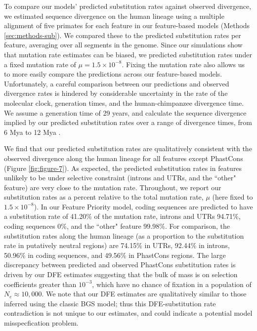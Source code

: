 \documentclass[11pt]{article}
\begin{document}
To compare our models' predicted substitution rates against observed
divergence, we estimated sequence divergence on the human lineage using a
multiple alignment of five primates for each feature in our feature-based
models (Methods \ref{sec:methods-sub}). We compared these to the predicted
substitution rates per feature, averaging over all segments in the genome.
Since our simulations show that mutation rate estimates can be biased, we
predicted substitution rates under a fixed mutation rate of $\mu = 1.5 \times
10^{-8}$. Fixing the mutation rate also allows us to more easily compare the
predictions across our feature-based models. Unfortunately, a careful
comparison between our predictions and observed divergence rates is hindered by
considerable uncertainty in the rate of the molecular clock, generation times,
and the human-chimpanzee divergence time. We assume a generation time of 29
years, and calculate the sequence divergence implied by our predicted
substitution rates over a range of divergence times, from 6 Mya to 12 Mya
\parencite{Moorjani2016-tb,Nachman2000-te,Yi2002-pw,Steiper2006-xx}.

We find that our predicted substitution rates are qualitatively consistent with
the observed divergence along the human lineage for all features except
PhastCons (Figure \ref{fig:figure-7}). As expected, the predicted substitution
rates in features unlikely to be under selective constraint (introns and UTRs,
and the ``other" feature) are very close to the mutation rate. Throughout, we
report our substitution rates as a percent relative to the total mutation rate,
$\mu$ (here fixed to $1.5 \times 10^{-8}$). In our Feature Priority model,
coding sequences are predicted to have a substitution rate of 41.20\% of the
mutation rate, introns and UTRs 94.71\%, coding sequences 0\%, and the ``other"
feature 99.98\%. For comparison, the substitution rates along the human lineage
(as a proportion to the substitution rate in putatively neutral regions) are
74.15\% in UTRs, 92.44\% in introns, 50.96\% in coding sequences, and 49.56\%
in PhastCons regions. The large discrepancy between predicted and observed
PhastCons substitution rates is driven by our DFE estimates suggesting that the
bulk of mass is on selection coefficients greater than $10^{-3}$, which have no
chance of fixation in a population of $N_e \approx 10,000$. We note that our
DFE estimates are qualitatively similar to those inferred using the classic BGS
model; thus this DFE-substitution rate contradiction is not unique to our
estimates, and could indicate a potential model misspecfication problem.
\end{document}
